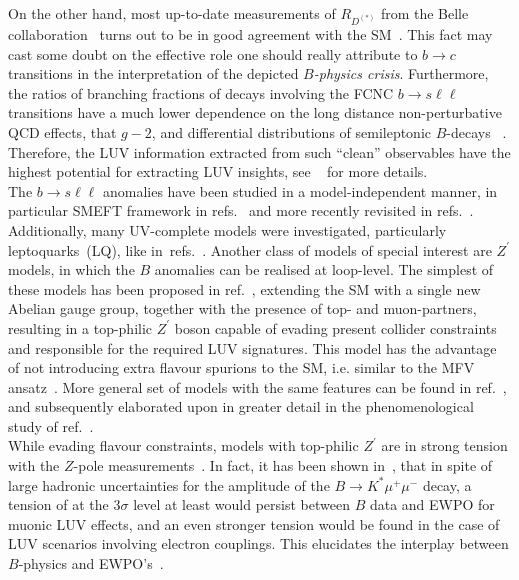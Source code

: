On the other hand, most up-to-date measurements of $R_{D^{(*)}}$ from the Belle collaboration~\cite{Hirose:2016wfn,Abdesselam:2019dgh} turns out to be in good agreement with the SM~\cite{Bigi:2016mdz,Bernlochner:2017jka,Bigi:2017jbd,Jaiswal:2017rve}. This fact may cast some doubt on the effective role one should really attribute to $ b \to c $ transitions in the interpretation of the depicted \textit{$B$-physics crisis}. 
Furthermore, the ratios of branching fractions of decays involving the FCNC $b \to s \ell \ell$ transitions have a much lower dependence on the long distance non-perturbative QCD effects, that $g-2$, and differential distributions of semileptonic $B$-decays~\cite{Capdevila:2016ivx,Serra:2016ivr,Wehle:2016yoi,Alguero:2019pjc} . Therefore, the LUV information extracted from such ``clean'' observables have the highest potential for extracting LUV insights, see ~\cite{Kou:2018nap} for more details.\\
The  $ b \to s \ell \ell$ anomalies have been studied in a model-independent manner, in particular SMEFT framework in refs.~\cite{DAmico:2017mtc,Geng:2017svp,Capdevila:2017bsm,Ciuchini:2017mik,Hiller:2017bzc} and more recently revisited in refs.~\cite{Ciuchini:2019usw,Aebischer:2019mlg,Alok:2019ufo,Alguero:2019ptt,Kowalska:2019ley,Arbey:2019duh,Datta:2019zca}.  Additionally, many UV-complete models were investigated, particularly leptoquarks~(LQ), like in~refs.~\cite{Calibbi:2015kma,Dorsner:2016wpm,Buttazzo:2017ixm,Kumar:2018kmr,Cornella:2019hct}. Another class of models of special interest are $Z^\prime$ models, in which the $B$ anomalies can be realised at loop-level. The simplest of these models has been proposed in ref.~\cite{Kamenik:2017tnu}, extending the SM with a single new Abelian gauge group, together with the presence of top- and muon-partners, resulting in a top-philic $Z^\prime$ boson capable of evading present collider constraints~\cite{Fox:2018ldq} and responsible for the required LUV signatures. This model has the advantage of not introducing extra flavour spurions to the SM, i.e. similar to the MFV ansatz~\cite{Buras:2000dm,DAmbrosio:2002vsn,Kagan:2009bn}.  More general set of models with the same features can be found  in ref.~\cite{Celis:2017doq},  and subsequently elaborated upon in greater detail in the phenomenological study of ref.~\cite{Camargo-Molina:2018cwu}. \\
While evading flavour constraints, models with top-philic $Z^\prime$ are in strong tension with the $Z$-pole measurements~\cite{Camargo-Molina:2018cwu,Efrati:2015eaa}. In fact, it has been shown in~\cite{Ciuchini:2019usw}, that in spite of  large hadronic uncertainties for the  amplitude of the $B \to K^{*} \mu^{+} \mu^{-}$ decay, a tension of at the 3$\sigma$ level at least would persist between $B$ data and EWPO for muonic LUV effects, and an even stronger tension would be found in the case of LUV scenarios involving electron couplings. This elucidates the interplay between $B$-physics and EWPO's~\cite{Bhattacharya:2014wla,Feruglio:2016gvd,Celis:2017doq,Buttazzo:2017ixm,Kumar:2018kmr,Ciuchini:2019usw,Aebischer:2019mlg,Cornella:2019hct}. \\
